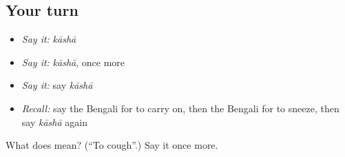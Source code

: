 \subsection*{Your turn}
\begin{itemize}
\raggedright
  \item \emph{Say it:} \emph{kāshā}
  \item \emph{Say it:} \emph{kāshā}, once more
  \item \emph{Say it:} say \emph{kāshā}
  \item \emph{Recall:} say the Bengali for to carry on, then the Bengali for to sneeze, then say \emph{kāshā} again
\end{itemize}

\begin{tcolorbox}[breakable,colback=teal!4,colframe=teal!35!black,title={Before you move on}]
What does  mean? (\textquotedblleft{}To cough\textquotedblright{}.) Say it once more.
\end{tcolorbox}
